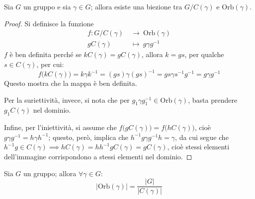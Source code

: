 \documentclass[11pt, a4paper]{scrartcl}
\theoremstyle{definition}
\numberwithin{esempio}{section}
\theoremstyle{definition}
\numberwithin{obs}{section}
\numberwithin{nota}{section}
\numberwithin{equation}{subsection}
\begin{document}
\begin{teorema}
	{}{}
	Sia $G$ un gruppo e sia $\gamma\in G$; allora esiste una biezione tra $G / C(\gamma)$ e $\mathrm{Orb} (\gamma)$.
	\begin{proof}
		Si definisce la funzione
		\[
		\begin{split}
			f:G / C(\gamma) \ &\longrightarrow \ \mathrm{Orb} (\gamma)\\
			gC(\gamma) \ &\longmapsto \ g \gamma g^{-1} 
		\end{split}
		\] 
		$f$ \`e ben definita perch\'e se $kC(\gamma) = g C(\gamma)$, allora $k = gs$, per qualche $s \in C(\gamma)$, per cui:
		\[
		f\big(kC(\gamma)\big) = k \gamma k^{-1} =(gs)\gamma(gs)^{-1} = gs \gamma s^{-1} g^{-1} =g \gamma g^{-1} 
		\] 
		Questo mostra che la mappa \`e ben definita.

		Per la suriettivit\`a, invece, si nota che per $g_1 \gamma g_1^{-1}  \in \mathrm{Orb} (\gamma)$, basta prendere $g_1 C(\gamma)$ nel dominio.

		Infine, per l'iniettivit\`a, si assume che $f\big(g C(\gamma)\big)= f\big(h C(\gamma)\big)$, cio\`e $g \gamma g^{-1} = h \gamma h^{-1} $; questo, per\`o, implica che $h^{-1} g \gamma g^{-1} h = \gamma$, da cui segue che $h^{-1} g \in C(\gamma)\implies hC(\gamma) = h h^{-1} g C(\gamma)=gC(\gamma)$, cio\`e stessi elementi dell'immagine corrispondono a stessi elementi nel dominio.
	\end{proof}
\end{teorema}
\begin{corollario}
	{}{}
	Sia $G$ un gruppo; allora $\forall \gamma \in G$:
	\[
	|\mathrm{Orb} (\gamma)| = \frac{|G|}{|C(\gamma)|}
	\] 
\end{corollario}
\end{document}
